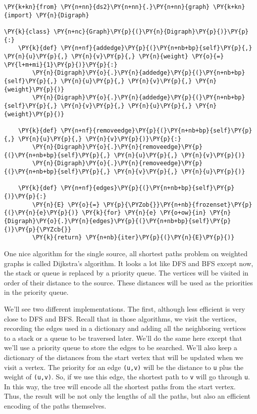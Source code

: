 \begin{Verbatim}[commandchars=\\\{\}]
\PY{k+kn}{from} \PY{n+nn}{ds2}\PY{n+nn}{.}\PY{n+nn}{graph} \PY{k+kn}{import} \PY{n}{Digraph}

\PY{k}{class} \PY{n+nc}{Graph}\PY{p}{(}\PY{n}{Digraph}\PY{p}{)}\PY{p}{:}
    \PY{k}{def} \PY{n+nf}{addedge}\PY{p}{(}\PY{n+nb+bp}{self}\PY{p}{,} \PY{n}{u}\PY{p}{,} \PY{n}{v}\PY{p}{,} \PY{n}{weight} \PY{o}{=} \PY{l+m+mi}{1}\PY{p}{)}\PY{p}{:}
        \PY{n}{Digraph}\PY{o}{.}\PY{n}{addedge}\PY{p}{(}\PY{n+nb+bp}{self}\PY{p}{,} \PY{n}{u}\PY{p}{,} \PY{n}{v}\PY{p}{,} \PY{n}{weight}\PY{p}{)}
        \PY{n}{Digraph}\PY{o}{.}\PY{n}{addedge}\PY{p}{(}\PY{n+nb+bp}{self}\PY{p}{,} \PY{n}{v}\PY{p}{,} \PY{n}{u}\PY{p}{,} \PY{n}{weight}\PY{p}{)}

    \PY{k}{def} \PY{n+nf}{removeedge}\PY{p}{(}\PY{n+nb+bp}{self}\PY{p}{,} \PY{n}{u}\PY{p}{,} \PY{n}{v}\PY{p}{)}\PY{p}{:}
        \PY{n}{Digraph}\PY{o}{.}\PY{n}{removeedge}\PY{p}{(}\PY{n+nb+bp}{self}\PY{p}{,} \PY{n}{u}\PY{p}{,} \PY{n}{v}\PY{p}{)}
        \PY{n}{Digraph}\PY{o}{.}\PY{n}{removeedge}\PY{p}{(}\PY{n+nb+bp}{self}\PY{p}{,} \PY{n}{v}\PY{p}{,} \PY{n}{u}\PY{p}{)}

    \PY{k}{def} \PY{n+nf}{edges}\PY{p}{(}\PY{n+nb+bp}{self}\PY{p}{)}\PY{p}{:}
        \PY{n}{E} \PY{o}{=} \PY{p}{\PYZob{}}\PY{n+nb}{frozenset}\PY{p}{(}\PY{n}{e}\PY{p}{)} \PY{k}{for} \PY{n}{e} \PY{o+ow}{in} \PY{n}{Digraph}\PY{o}{.}\PY{n}{edges}\PY{p}{(}\PY{n+nb+bp}{self}\PY{p}{)}\PY{p}{\PYZcb{}}
        \PY{k}{return} \PY{n+nb}{iter}\PY{p}{(}\PY{n}{E}\PY{p}{)}
\end{Verbatim}



One nice algorithm for the single source, all shortest paths problem on weighted graphs is called Dijkstra's algorithm.
It looks a lot like DFS and BFS except now, the stack or queue is replaced by a priority queue.
The vertices will be visited in order of their distance to the source.
These distances will be used as the priorities in the priority queue.


We'll see two different implementations.
The first, although less efficient is very close to DFS and BFS.
Recall that in those algorithms, we visit the vertices, recording the edges used in a dictionary and adding all the neighboring vertices to a stack or a queue to be traversed later.
We'll do the same here except that we'll use a priority queue to store the edges to be searched.
We'll also keep a dictionary of the distances from the start vertex that will be updated when we visit a vertex.
The priority for an edge \texttt{(u,v)} will be the distance to \texttt{u} plus the weight of \texttt{(u,v)}.
So, if we use this edge, the shortest path to \texttt{v} will go through \texttt{u}.
In this way, the tree will encode all the shortest paths from the start vertex.
Thus, the result will be not only the lengths of all the paths, but also an efficient encoding of the paths themselves.

